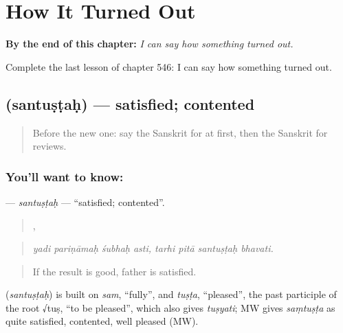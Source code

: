 
\chapter{How It Turned Out}
\label{ch:sa-how-it-turned-out}

\begin{chapteropening}
\textbf{By the end of this chapter:} \emph{I can say how something turned out.}

Complete the last lesson of chapter 546: I can say how something turned out.
\end{chapteropening}

\section[\texorpdfstring{\sk{सन्तुष्टः} (santuṣṭaḥ)}{सन्तुष्टः (santuṣṭaḥ)}]{ (santuṣṭaḥ) — satisfied; contented}

\label{lesson:SA-C546-santustah}



\begin{quote}
Before the new one: say the Sanskrit for at first, then the Sanskrit for reviews.
\end{quote}

\subsection*{You'll want to know: }
\textbf{} — \emph{santuṣṭaḥ} — \textquotedblleft{}satisfied; contented\textquotedblright{}.

\begin{quote}
   ,    
\end{quote}

\begin{quote}
\emph{yadi pariṇāmaḥ śubhaḥ asti, tarhi pitā santuṣṭaḥ bhavati.}
\end{quote}

\begin{quote}
If the result is good, father is satisfied.
\end{quote}

\begin{cousinweb}
\textbf{} (\emph{santuṣṭaḥ}) is built on \emph{sam}, \textquotedblleft{}fully\textquotedblright{}, and \emph{tuṣṭa}, \textquotedblleft{}pleased\textquotedblright{}, the past participle of the root √tuṣ, \textquotedblleft{}to be pleased\textquotedblright{}, which also gives \emph{tuṣyati}; MW gives \emph{saṃtuṣṭa} as quite satisfied, contented, well pleased (MW).
\end{cousinweb}

